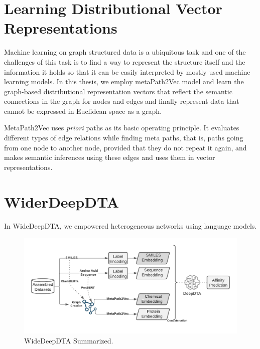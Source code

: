 \section{Learning Distributional Vector Representations}
Machine learning on graph structured data is a ubiquitous task and one of the challenges of this task is to find a way to represent the structure itself and the information it holds so that it can be easily interpreted by mostly used machine learning models. In this thesis, we employ metaPath2Vec \cite{dong2017metapath2vec} model and learn the graph-based distributional representation vectors that reflect the semantic connections in the graph for nodes and edges and finally represent data that cannot be expressed in Euclidean space as a graph.

MetaPath2Vec uses \textit{priori} paths as its basic operating principle. It evaluates different types of edge relations while finding meta paths, that is, paths going from one node to another node, provided that they do not repeat it again, and makes semantic inferences using these edges and uses them in vector representations.






\section{WiderDeepDTA}
In WideDeepDTA, we empowered heterogeneous networks using language models. 


\begin{figure}
    \centering
        \includegraphics[width=\linewidth]{chapters/materials_and_methods/figures/WiderDeepDTA.png}
    \caption{WideDeepDTA Summarized.}
    \label{fig:widerdeepdta}
\end{figure}


